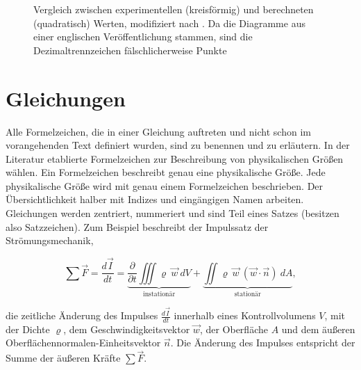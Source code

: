 \begin{figure}[htpb]
	\caption{Vergleich zwischen experimentellen (kreisförmig) und berechneten (quadratisch) Werten, modifiziert nach \cite{wieth2016}. Da die Diagramme aus einer englischen Veröffentlichung stammen, sind die Dezimaltrennzeichen fälschlicherweise Punkte}
	\label{fig:several_graphics}
\end{figure}

\clearpage

\section{Gleichungen}
\label{SECTION:Gleichungen}

Alle Formelzeichen, die in einer Gleichung auftreten und nicht schon im vorangehenden Text definiert wurden, sind zu benennen und zu erläutern. In der Literatur etablierte Formelzeichen zur Beschreibung von physikalischen Größen wählen. Ein Formelzeichen beschreibt genau eine physikalische Größe. Jede physikalische Größe wird mit genau einem Formelzeichen beschrieben. Der Übersichtlichkeit halber mit Indizes und eingängigen Namen arbeiten. Gleichungen werden zentriert, nummeriert und sind Teil eines Satzes (besitzen also Satzzeichen). Zum Beispiel beschreibt der Impulssatz der Strömungsmechanik,

\begin{equation}
\label{EQUATION:Impuls}
\sum\vec{F}=\frac{d\vec{I}}{dt}=\underbrace{\frac{\partial}{\partial t}\iiint\varrho\:\vec{w}\:dV}_{\text{instationär}} + \underbrace{\iint\varrho\:\vec{w}\:\left(\vec{w}\cdot\vec{n}\right)\:dA}_{\text{stationär}},
\end{equation}

die zeitliche Änderung des Impulses $\frac{d\vec{I}}{dt}$ innerhalb eines Kontrollvolumens $V$, mit  der Dichte $\varrho$, dem Geschwindigkeitsvektor $\vec{w}$, der Oberfläche $A$ und dem äußeren Oberflächennormalen-Einheitsvektor $\vec{n}$. Die Änderung des Impulses entspricht der Summe der äußeren Kräfte $\sum\vec{F}$.

